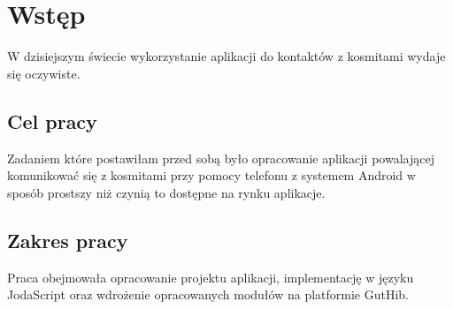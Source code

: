 
\chapter*{Wstęp}

W dzisiejszym świecie wykorzystanie aplikacji do kontaktów z kosmitami wydaje się oczywiste. \lipsum[6]

\section*{Cel pracy}

Zadaniem które postawiłam przed sobą było opracowanie aplikacji powalającej komunikować się z kosmitami przy pomocy telefonu z systemem Android w sposób prostszy niż czynią to dostępne na rynku aplikacje. 

\section*{Zakres pracy}

Praca obejmowała opracowanie projektu aplikacji, implementację w języku JodaScript oraz wdrożenie opracowanych modułów na platformie GutHib. \lipsum[14]
